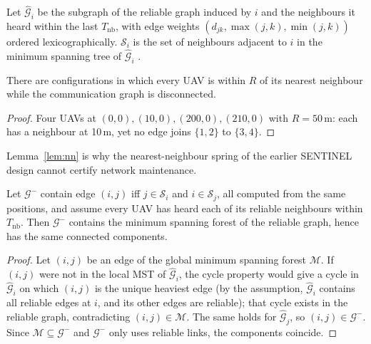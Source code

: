 \begin{definition}
Let $\hat{\mathcal{G}}_i$ be the subgraph of the reliable graph induced by $i$ and the neighbours it
heard within the last $T_{\mathrm{nb}}$, with edge weights $(d_{jk},\max(j,k),\min(j,k))$ ordered
lexicographically. $\mathcal{S}_i$ is the set of neighbours adjacent to $i$ in the minimum
spanning tree of $\hat{\mathcal{G}}_i$ \cite{li2003lmst}.
\end{definition}

\begin{lemma}\label{lem:nn}
There are configurations in which every UAV is within $R$ of its nearest neighbour while the
communication graph is disconnected.
\end{lemma}
\begin{proof}
Four UAVs at $(0,0),(10,0),(200,0),(210,0)$ with $R=50$\,m: each has a neighbour at 10\,m, yet no
edge joins $\{1,2\}$ to $\{3,4\}$.
\end{proof}
Lemma~\ref{lem:nn} is why the nearest-neighbour spring of the earlier SENTINEL design cannot certify
network maintenance.

\begin{lemma}\label{lem:lmst}
Let $\mathcal{G}^-$ contain edge $(i,j)$ iff $j\in\mathcal{S}_i$ and $i\in\mathcal{S}_j$, all
computed from the same positions, and assume every UAV has heard each of its reliable neighbours
within $T_{\mathrm{nb}}$. Then $\mathcal{G}^-$ contains the minimum spanning forest of
the reliable graph, hence has the same connected components.
\end{lemma}
\begin{proof}
Let $(i,j)$ be an edge of the global minimum spanning forest $\mathcal{M}$. If $(i,j)$ were not
in the local MST of $\hat{\mathcal{G}}_i$, the cycle property would give a cycle in
$\hat{\mathcal{G}}_i$ on which $(i,j)$ is the unique heaviest edge (by the assumption, $\hat{\mathcal{G}}_i$
contains all reliable edges at $i$, and its other edges are reliable); that cycle exists in the
reliable graph, contradicting $(i,j)\in\mathcal{M}$. The same holds for $\hat{\mathcal{G}}_j$, so
$(i,j)\in\mathcal{G}^-$. Since $\mathcal{M}\subseteq\mathcal{G}^-$ and $\mathcal{G}^-$ only uses
reliable links, the components coincide.
\end{proof}

